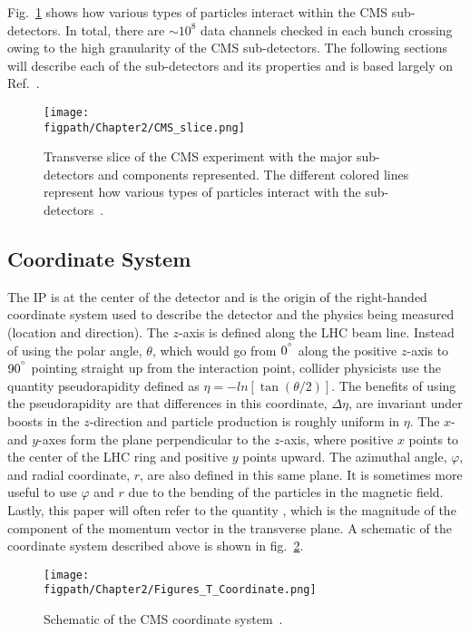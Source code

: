 Fig.~\ref{fig:CMS_transverse} shows how various types of particles interact within the CMS sub-detectors.
In total, there are ${\sim}10^8$ data channels checked in each bunch crossing owing to the high granularity of the CMS sub-detectors.
The following sections will describe each of the sub-detectors and its properties and is based largely on Ref.~\cite{Chatrchyan:2008aa}.

\begin{figure}[!hbt]
	\centering
	\texttt{[image: \\figpath/Chapter2/CMS\_slice.png]}
	\caption{Transverse slice of the CMS experiment with the major sub-detectors and components represented. The different colored lines represent how various types of particles interact with the sub-detectors~\cite{CMSSlice}.}
	\label{fig:CMS_transverse}
\end{figure}

\subsection{Coordinate System}

The IP is at the center of the detector and is the origin of the right-handed coordinate system used to describe the detector and the physics being measured (location and direction).
The $z$-axis is defined along the LHC beam line.
Instead of using the polar angle, $\theta$, which would go from $0^{^\circ}$ along the positive $z$-axis to $90^{^\circ}$ pointing straight up from the interaction point, collider physicists use the quantity pseudorapidity defined as $\eta=-ln\left[\tan\left(\theta/2\right)\right]$.
The benefits of using the pseudorapidity are that differences in this coordinate, $\Delta\eta$, are invariant under boosts in the $z$-direction and particle production is roughly uniform in $\eta$.
The $x$- and $y$-axes form the plane perpendicular to the $z$-axis, where positive $x$ points to the center of the LHC ring and positive $y$ points upward.
The azimuthal angle, $\varphi$, and radial coordinate, $r$, are also defined in this same plane.
It is sometimes more useful to use $\varphi$ and $r$ due to the bending of the particles in the magnetic field.
Lastly, this paper will often refer to the quantity \pt, which is the magnitude of the component of the momentum vector in the transverse plane.
A schematic of the coordinate system described above is shown in fig.~\ref{fig:CMS_coordinate_system}.

\begin{figure}[!hbt]
	\centering
	\texttt{[image: \\figpath/Chapter2/Figures\_T\_Coordinate.png]}
	\caption{Schematic of the CMS coordinate system~\cite{Schott:2014sea}.}
	\label{fig:CMS_coordinate_system}
\end{figure}


